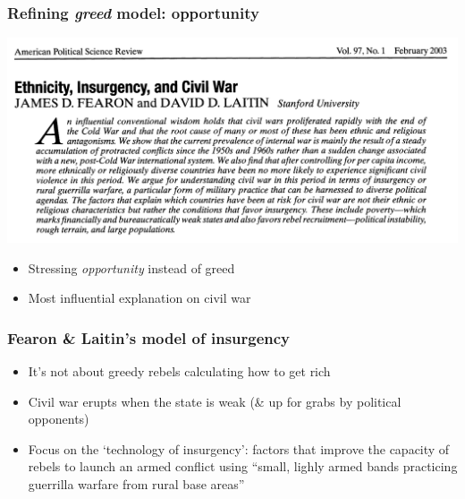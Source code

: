 \documentclass[utf8, xcolor=dvipsnames]{beamer}
\begin{document}
\begin{frame}
\frametitle{Refining \textit{greed} model: opportunity}
\centering

\includegraphics[width = \textwidth]{img/fearon_laitin}

\begin{itemize}
  \item Stressing \textit{opportunity} instead of greed
  \item Most influential explanation on civil war
\end{itemize}

\end{frame}

\begin{frame}
\frametitle{Fearon \& Laitin's model of insurgency}
\centering

\begin{itemize}[<+->]
  \item It's not about greedy rebels calculating how to get rich
  \item Civil war erupts when the state is weak (\& up for grabs by political opponents)
  \item Focus on the `technology of insurgency': factors that improve the capacity of rebels to launch an armed conflict using ``small, lighly armed bands practicing guerrilla warfare from rural base areas''
\end{itemize}

\end{frame}
\end{document}
